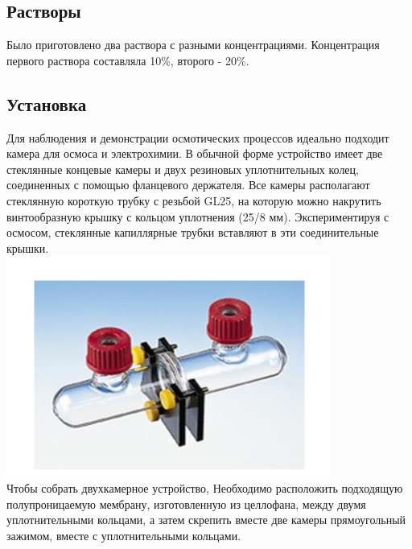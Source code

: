 \documentclass{article}
\begin{document}
        \subsection*{Растворы}
            \hspace*{4mm}Было приготовлено два раствора  с разными концентрациями.
            Концентрация первого раствора составляла 10\%, второго - 20\%.


        \subsection*{Установка}
            \hspace*{4mm}Для наблюдения и демонстрации осмотических процессов идеально
            подходит камера для осмоса и электрохимии. В обычной форме
            устройство имеет две стеклянные концевые камеры и двух резиновых
            уплотнительных колец, соединенных с помощью фланцевого держателя. Все
            камеры располагают стеклянную короткую трубку с резьбой GL25, на которую
            можно накрутить винтообразную крышку с кольцом уплотнения (25/8 мм).
            Экспериментируя с осмосом, стеклянные капиллярные трубки вставляют в эти
            соединительные крышки. \\
        
            \includegraphics*[width=0.8\textwidth]{tools1.png} \\

            \hspace*{4mm}Чтобы собрать двухкамерное устройство,
            Необходимо расположить подходящую полупроницаемую мембрану,
            изготовленную из целлофана, между двумя уплотнительными кольцами, а затем
            скрепить вместе две камеры прямоугольный зажимом, вместе с
            уплотнительными кольцами. \\
\end{document}
